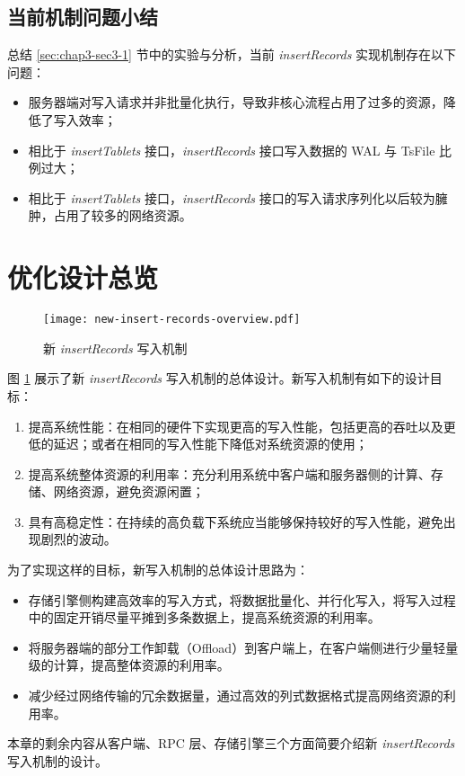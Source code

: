 \subsection{当前机制问题小结}
总结 \ref{sec:chap3-sec3-1} 节中的实验与分析，当前 \emph{insertRecords} 实现机制存在以下问题：
\begin{itemize}
  \item 服务器端对写入请求并非批量化执行，导致非核心流程占用了过多的资源，降低了写入效率；
  \item 相比于 \emph{insertTablets} 接口，\emph{insertRecords} 接口写入数据的 WAL 与 TsFile 比例过大；
  \item 相比于 \emph{insertTablets} 接口，\emph{insertRecords} 接口的写入请求序列化以后较为臃肿，占用了较多的网络资源。
\end{itemize}

\section{优化设计总览}
\begin{figure}
  \centering
  \texttt{[image: new-insert-records-overview.pdf]}
  \caption{新 \emph{insertRecords} 写入机制}
  \label{fig:new-insert-records-overview}
\end{figure}

图 \ref{fig:new-insert-records-overview} 展示了新 \emph{insertRecords} 写入机制的总体设计。新写入机制有如下的设计目标：
\begin{enumerate}
  \item 提高系统性能：在相同的硬件下实现更高的写入性能，包括更高的吞吐以及更低的延迟；或者在相同的写入性能下降低对系统资源的使用；
  \item 提高系统整体资源的利用率：充分利用系统中客户端和服务器侧的计算、存储、网络资源，避免资源闲置；
  \item 具有高稳定性：在持续的高负载下系统应当能够保持较好的写入性能，避免出现剧烈的波动。
\end{enumerate}
为了实现这样的目标，新写入机制的总体设计思路为：
\begin{itemize}
  \item 存储引擎侧构建高效率的写入方式，将数据批量化、并行化写入，将写入过程中的固定开销尽量平摊到多条数据上，提高系统资源的利用率。
  \item 将服务器端的部分工作卸载（Offload）到客户端上，在客户端侧进行少量轻量级的计算，提高整体资源的利用率。
  \item 减少经过网络传输的冗余数据量，通过高效的列式数据格式提高网络资源的利用率。
\end{itemize}
本章的剩余内容从客户端、RPC 层、存储引擎三个方面简要介绍新 \emph{insertRecords} 写入机制的设计。

